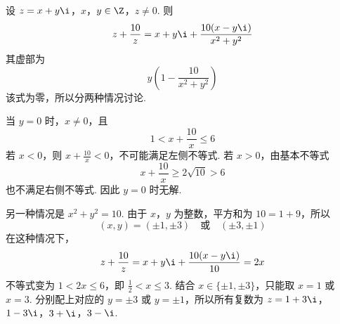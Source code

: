 \begin{solution}
设
\(z=x+y\i\)，\(x\)，\(y\in\Z\)，\(z\ne0\).
则
\[
z+\frac{10}{z}=x+y\i+\frac{10(x-y\i)}{x^2+y^2}
\]
其虚部为
\[
y\left(1-\frac{10}{x^2+y^2}\right)
\]
该式为零，所以分两种情况讨论.

当 \(y=0\) 时，\(x\ne0\)，且
\[
1<x+\frac{10}{x}\leqslant6
\]
若 \(x<0\)，则 \(x+\frac{10}{x}<0\)，不可能满足左侧不等式. 若 \(x>0\)，由基本不等式
\[
x+\frac{10}{x}\geqslant2\sqrt{10}>6
\]
也不满足右侧不等式. 因此 \(y=0\) 时无解.

另一种情况是 \(x^2+y^2=10\). 由于 \(x\)，\(y\) 为整数，平方和为 \(10=1+9\)，所以
\[
(x,y)=(\pm1,\pm3)\quad\text{或}\quad(\pm3,\pm1)
\]
在这种情况下，
\[
z+\frac{10}{z}=x+y\i+\frac{10(x-y\i)}{10}=2x
\]
不等式变为 \(1<2x\leqslant6\)，即 \(\frac12<x\leqslant3\). 结合 \(x\in\{\pm1,\pm3\}\)，只能取 \(x=1\) 或 \(x=3\). 分别配上对应的 \(y=\pm3\) 或 \(y=\pm1\)，所以所有复数为
\(z=1+3\i\)，\(1-3\i\)，\(3+\i\)，\(3-\i\).
\end{solution}
